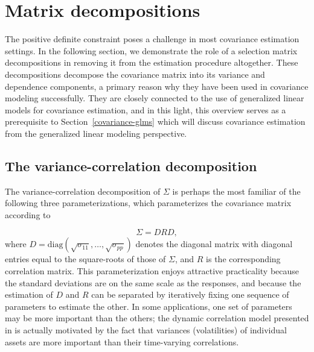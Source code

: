 

\section{Matrix decompositions} \label{chapter-1-matrix-decompositions}


The positive definite constraint poses a challenge in most covariance estimation settings. In the following section, we demonstrate the role of a selection matrix decompositions in removing it from the estimation procedure altogether. These decompositions decompose the covariance matrix into its variance and dependence components, a primary reason why they have been used in covariance modeling successfully. They are closely connected to the use of generalized linear models for covariance estimation, and in this light, this overview serves as a prerequisite to Section~\ref{covariance-glms} which will discuss covariance estimation from the generalized linear modeling perspective. 


\subsection{The variance-correlation decomposition}

The variance-correlation decomposition of $\Sigma$ is perhaps the most familiar of the following three parameterizations, which parameterizes the covariance matrix according to

\begin{equation}\label{eq:variance-correlation-decomposition}
\Sigma = DRD,
\end{equation}
\noindent
where $D = \mbox{diag}\left(\sqrt{\sigma_{11}},\dots , \sqrt{\sigma_{pp}}\right)$ denotes the diagonal matrix with diagonal entries equal to the square-roots of those of $\Sigma$, and $R$ is the corresponding correlation matrix. This parameterization enjoys attractive practicality because the standard deviations are on the same scale as the responses, and because the estimation of $D$ and $R$ can be separated by iteratively fixing one sequence of parameters to estimate the other. In some applications, one set of parameters may be more important than the others; the dynamic correlation model presented in \cite{engle2002dynamic} is actually motivated by the fact that variances (volatilities) of individual assets are more important than their time-varying correlations.
\bigskip

